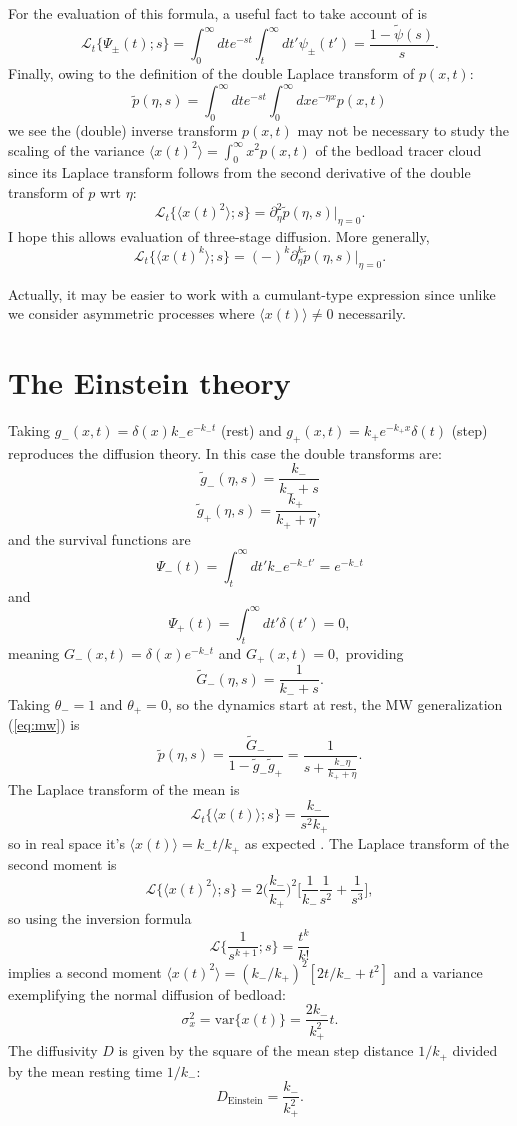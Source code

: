 \documentclass[11pt]{article}
\newcommand\be{\begin{equation}} %
\newcommand\ee{\end{equation}}   %
\newcommand\bra{\langle}
\newcommand\ket{\rangle}
\newcommand\El{\mathcal{L}}
\newcommand\tg{\tilde{g}}
\newcommand\tG{\tilde{G}}
\begin{document}
For the evaluation of this formula, a useful fact to take account of is 
\be \El_t\{ \Psi_\pm(t);s\} = \int_0^\infty dt e^{-st} \int_t^\infty dt' \psi_\pm(t') = \frac{1-\tilde{\psi}(s)}{s}. \ee
Finally, owing to the definition of the double Laplace transform of $p(x,t)$:
\be \tilde{p}(\eta,s) = \int_0^\infty dt e^{-st} \int_0^\infty dx e^{-\eta x} p(x,t)\ee
we see the (double) inverse transform $p(x,t)$ may not be necessary to study the scaling of the variance $\bra x(t)^2 \ket = \int_0^\infty x^2 p(x,t)$ of the bedload tracer cloud since its Laplace transform follows from the second derivative of the double transform of $p$ wrt $\eta$:
\be \El_t\{ \bra x(t)^2 \ket;s\} = \partial_\eta^2 \tilde{p}(\eta,s)\Big|_{\eta=0}. \label{eq:var}
\ee
I hope this allows evaluation of three-stage diffusion.
More generally, 
\be \El_t\{\bra x(t)^k\ket;s\} = (-)^k\partial_\eta^k \tilde{p}(\eta,s)\Big|_{\eta=0}.\ee

Actually, it may be easier to work with a cumulant-type expression since unlike \citet{Masoliver2016,Masoliver2017} we consider asymmetric processes where $\bra x(t) \ket \neq 0$ necessarily.

\section{The Einstein theory}
Taking $g_-(x,t) = \delta(x)k_- e^{-k_-t}$ (rest) and $g_+(x,t) = k_+ e^{-k_+ x}\delta(t) $ (step) reproduces the \citet{Einstein1937} diffusion theory.
In this case the double transforms are: 
\be \tilde{g}_-(\eta,s) = \frac{k_-}{k_-+s}\ee
\be \tilde{g}_+(\eta,s) = \frac{k_+}{k_++\eta}, \ee
and the survival functions are 
\be \Psi_-(t) = \int_t^\infty dt' k_-e^{-k_- t'} = e^{-k_- t} \ee
and 
\be \Psi_+(t) = \int_t^\infty dt' \delta(t') = 0 ,  \ee
meaning $G_-(x,t) = \delta(x) e^{-k_- t}$ and $G_+(x,t) = 0,$ providing
\be \tG_-(\eta,s) = \frac{1}{k_-+s}.\ee
Taking $\theta_-=1$ and $\theta_+=0$, so the dynamics start at rest, the MW generalization (\ref{eq:mw}) is
\be \tilde{p}(\eta, s) = \frac{\tG_-}{1-\tg_-\tg_+} = \frac{1}{s + \frac{k_- \eta}{k_+ + \eta }}.\label{eq:mwgen}\ee
The Laplace transform of the mean is 
\be \El_t\{\bra x(t) \ket;s\} = \frac{k_-}{s^2 k_+}
\ee
so in real space it's $\bra x(t) \ket = k_- t/k_+$ as expected \citep[e.g.][]{Einstein1937, Nakagawa1976}.
The Laplace transform of the second moment is 
\be \El \{\bra x(t)^2 \ket; s\} = 2\Big(\frac{k_-}{k_+}\Big)^2 \Big[ \frac{1}{k_-}\frac{1}{s^2} + \frac{1}{s^3}\Big], \ee
so using the inversion formula 
\be \El\Big\{\frac{1}{s^{k+1}};s\Big\} = \frac{t^k}{k!}\ee
implies a second moment $\bra x(t)^2 \ket = (k_-/k_+)^2[2t/k_-+t^2] $
and a variance exemplifying the normal diffusion of bedload:
\be \sigma_x^2 = \text{var}\{x(t)\} = \frac{2k_-}{k_+^2}t.\ee
The diffusivity $D$ is given by the square of the mean step distance $1/k_+$ divided by the mean resting time $1/k_-$:
\be D_\text{Einstein} = \frac{k_-}{k_+^2}.\ee
\end{document}
